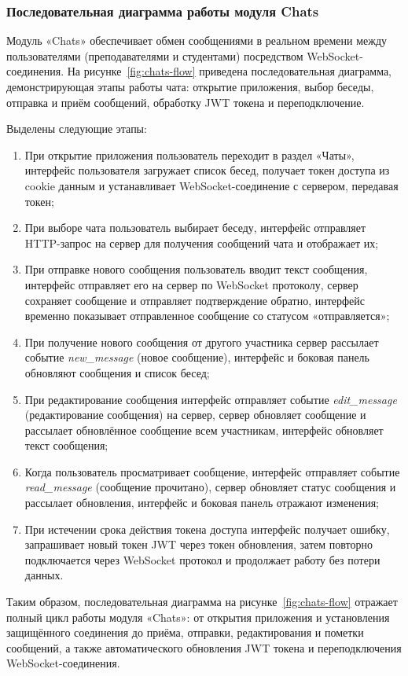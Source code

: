 \subsubsection{Последовательная диаграмма работы модуля Chats}
Модуль «Chats» обеспечивает обмен сообщениями в реальном времени между пользователями (преподавателями и студентами) посредством WebSocket-соединения. На рисунке~\ref{fig:chats-flow} приведена последовательная диаграмма, демонстрирующая этапы работы чата: открытие приложения, выбор беседы, отправка и приём сообщений, обработку JWT токена и переподключение.

Выделены следующие этапы:

\begin{enumerate}
    \item При открытие приложения пользователь переходит в раздел «Чаты», интерфейс пользователя загружает список бесед, получает токен доступа из cookie данным и устанавливает WebSocket-соединение с сервером, передавая токен;
    \item При выборе чата пользователь выбирает беседу, интерфейс отправляет HTTP-запрос на сервер для получения сообщений чата и отображает их;
    \item При отправке нового сообщения пользователь вводит текст сообщения, интерфейс отправляет его на сервер по WebSocket протоколу, сервер сохраняет сообщение и отправляет подтверждение обратно, интерфейс временно показывает отправленное сообщение со статусом «отправляется»;
    \item При получение нового сообщения от другого участника сервер рассылает событие \textit{new\_message} (новое сообщение), интерфейс и боковая панель обновляют сообщения и список бесед;
    \item При редактирование сообщения интерфейс отправляет событие \textit{edit\_message} (редактирование сообщения) на сервер, сервер обновляет сообщение и рассылает обновлённое сообщение всем участникам, интерфейс обновляет текст сообщения;
    \item Когда пользователь просматривает сообщение, интерфейс отправляет событие \textit{read\_message} (сообщение прочитано), сервер обновляет статус сообщения и рассылает обновления, интерфейс и боковая панель отражают изменения;
    \item При истечении срока действия токена доступа интерфейс получает ошибку, запрашивает новый токен JWT через токен обновления, затем повторно подключается через WebSocket протокол и продолжает работу без потери данных.
\end{enumerate}

Таким образом, последовательная диаграмма на рисунке~\ref{fig:chats-flow} отражает полный цикл работы модуля «Chats»: от открытия приложения и установления защищённого соединения до приёма, отправки, редактирования и пометки сообщений, а также автоматического обновления JWT токена и переподключения WebSocket-соединения. 

